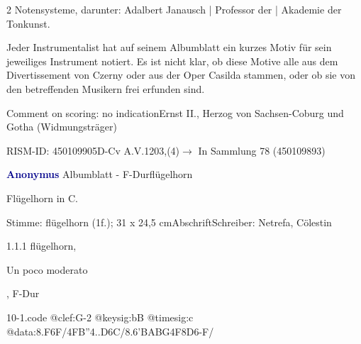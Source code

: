 \documentclass[a4paper, twocolumn, 11pt]{book}
\begin{document}
\newline %
\par 2 Notensysteme, darunter: Adalbert Janausch | Professor der | Akademie der Tonkunst.
\par Jeder Instrumentalist hat auf seinem Albumblatt ein kurzes Motiv für sein jeweiliges Instrument notiert. Es ist nicht klar, ob diese Motive alle aus dem {\textquotedbl}Divertissement{\textquotedbl} von Czerny oder aus der Oper {\textquotedbl}Casilda{\textquotedbl} stammen, oder ob sie von den betreffenden Musikern frei erfunden sind.
\par Comment on scoring: no indication\newline Ernst II., Herzog von Sachsen-Coburg und Gotha  (Widmungsträger)
\par RISM-ID: 450109905\newline D-Cv  A.V.1203,(4)\newline $\rightarrow$ In Sammlung 78 (450109893)
      
\par \vspace{16pt} \textcolor{darkblue}{\textbf{Anonymus  }}\hfillplus{[10]}\newline Albumblatt - F-Dur\newline flügelhorn
\par \begin{itshape}[heading:] Flügelhorn in C.\end{itshape} 
\par \textcolor{darkblue}{}  Stimme: flügelhorn  (1f.); 31 x 24,5 cm\newline Abschrift\newline Schreiber: Netrefa, Cölestin
\par 1.1.1  flügelhorn, \begin{itshape}Un poco moderato\end{itshape}, F-Dur  
\begin{filecontents*}{10-1.code}
@clef:G-2
@keysig:bB
@timesig:c
@data:{8.F6F}/4FB''4..D6C/8.6'{BABG}4F8D6-F/
\end{filecontents*}
\end{document}
